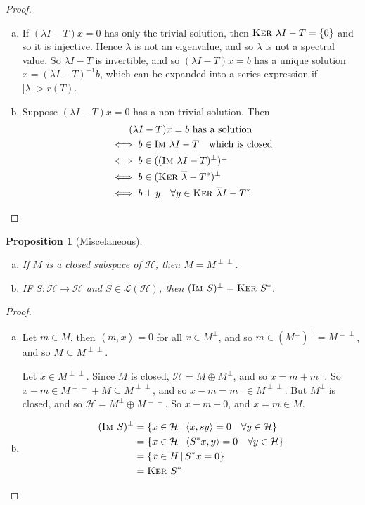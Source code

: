 \documentclass[10pt, reqno, oneside]{amsart}
\theoremstyle{plain}%
\newtheorem{prop}[thm]{Proposition}
\theoremstyle{definition}
\theoremstyle{remark}
\newcommand{\given}{ \, | \,}
\newcommand{\iprod}[1]{\left\langle #1 \right\rangle}
\newcommand{\im}{\textsc{Im\ }}
\renewcommand{\ker}{\textsc{Ker\ }}
\begin{document}
\begin{proof}
	{\ } \begin{enumerate}[(a)]
		\item If $(\lambda I - T) x = 0$ has only the trivial solution, then $\ker \lambda I - T = \{ 0 \}$ and so it is injective.  Hence $\lambda$ is not an eigenvalue, and so $\lambda$ is not a spectral value.  So $\lambda I - T$ is invertible, and so $(\lambda I - T) x = b$ has a unique solution $x = (\lambda I - T)^{-1} b$, which can be expanded into a series expression if $|\lambda| > r(T)$.  
		\item Suppose $(\lambda I - T) x = 0$ has a non-trivial solution.  Then
		\begin{align*}
			&\qquad\text{$(\lambda I - T) x = b$ has a solution} \\
			&\iff b \in \im \lambda I - T \quad \text{which is closed} \\
			&\iff b \in ((\im \lambda I - T)^\perp)^\perp \\
			&\iff b \in (\ker \overline \lambda - T^*)^\perp \\
			&\iff b \perp y \quad \forall y \in \ker \overline \lambda I - T^*.\qedhere
		\end{align*}
	\end{enumerate}
\end{proof}

\begin{prop}[Miscelaneous]{\ }\begin{enumerate}[(a)]
	\item If $M$ is a closed subspace of $\mathcal H$, then $M = M^{\perp \perp}$. 
	\item IF $S: \mathcal H \rightarrow \mathcal H$ and $S \in \mathcal L(\mathcal H)$, then $(\im S)^\perp = \ker S^*$.  
\end{enumerate}
\end{prop}

\begin{proof}{\ }
	\begin{enumerate}[(a)]
		\item Let $m \in M$, then $\iprod{m, x} = 0$ for all $x \in M^\perp$, and so $m \in (M^\perp)^\perp = M^{\perp \perp}$, and so $M \subseteq M^{\perp \perp}$.  
		
		Let $x \in M^{\perp \perp}$.  Since $M$ is closed, $\mathcal H = M \oplus M^{\perp}$, and so $x = m + m^\perp$.  So $x - m \in M^{\perp \perp} + M \subseteq M^{\perp \perp}$, and so $x - m = m^\perp \in M^{\perp \perp}$.  But $M^\perp$ is closed, and so $\mathcal H = M^\perp \oplus M^{\perp \perp}$.  So $x - m - 0$, and $x = m \in M$.  
		\item \begin{align*}
			(\im S)^\perp &= \{ x \in \mathcal H \given \iprod{x, sy} = 0 \quad \forall y \in \mathcal H \} \\
							&= \{ x \in \mathcal H \given \iprod{S^* x, y} = 0 \quad \forall y \in \mathcal H \} \\
							&= \{ x \in H \given S^* x = 0 \} \\
							&= \ker S^*
		\end{align*} 
	\end{enumerate}
\end{proof}
\end{document}
